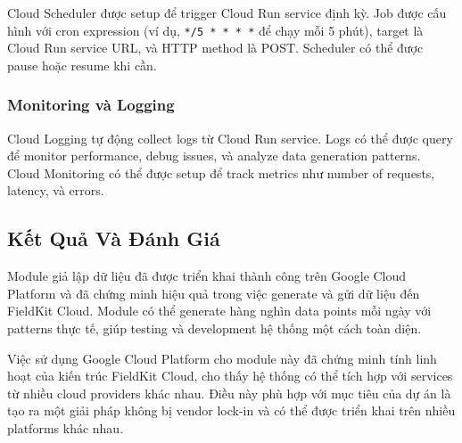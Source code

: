 Cloud Scheduler được setup để trigger Cloud Run service định kỳ. Job được cấu hình với cron expression (ví dụ, \texttt{*/5 * * * *} để chạy mỗi 5 phút), target là Cloud Run service URL, và HTTP method là POST. Scheduler có thể được pause hoặc resume khi cần.

\subsubsection{Monitoring và Logging}

Cloud Logging tự động collect logs từ Cloud Run service. Logs có thể được query để monitor performance, debug issues, và analyze data generation patterns. Cloud Monitoring có thể được setup để track metrics như number of requests, latency, và errors.

\subsection{Kết Quả Và Đánh Giá}

Module giả lập dữ liệu đã được triển khai thành công trên Google Cloud Platform và đã chứng minh hiệu quả trong việc generate và gửi dữ liệu đến FieldKit Cloud. Module có thể generate hàng nghìn data points mỗi ngày với patterns thực tế, giúp testing và development hệ thống một cách toàn diện.

Việc sử dụng Google Cloud Platform cho module này đã chứng minh tính linh hoạt của kiến trúc FieldKit Cloud, cho thấy hệ thống có thể tích hợp với services từ nhiều cloud providers khác nhau. Điều này phù hợp với mục tiêu của dự án là tạo ra một giải pháp không bị vendor lock-in và có thể được triển khai trên nhiều platforms khác nhau.

